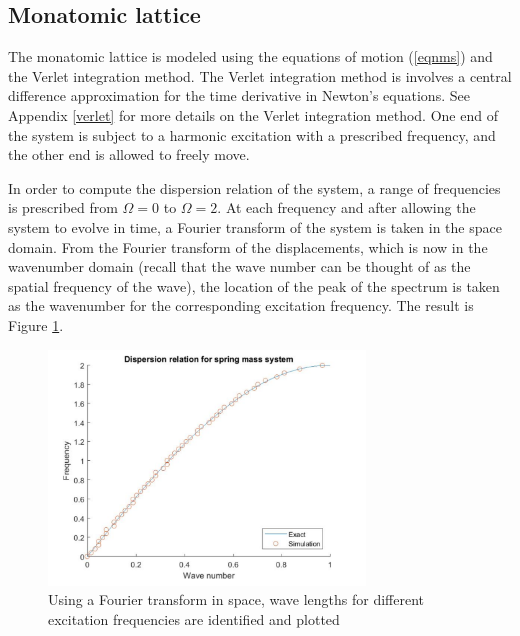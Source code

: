 \documentclass{article}
\begin{document}
\subsection{Monatomic lattice}
The monatomic lattice is modeled using the equations of motion (\ref{eqnms}) 
and the Verlet integration method. The Verlet integration method is involves a 
central difference approximation for the time derivative in Newton's equations. 
See Appendix \ref{verlet} for more details on the Verlet integration method. 
One end of the system is subject to a harmonic excitation with a prescribed 
frequency, and the other end is allowed to freely move.

In order to compute the dispersion relation of the system, a range of 
frequencies is prescribed from $\Omega=0$ to $\Omega=2$. At each frequency and 
after allowing the system to evolve in time, a Fourier transform of the system 
is taken in the space domain. From the Fourier transform of the displacements, 
which is now in the wavenumber domain (recall that the wave number can be 
thought of as the spatial frequency of the wave), the location of the peak of 
the spectrum is taken as the wavenumber for the corresponding excitation 
frequency. The result is Figure \ref{fig:matlab-dr}.
\begin{figure}[!htbp]
	\centering
	\includegraphics[width=0.75\textwidth]{matlab-dr.pdf}
	\caption{Using a Fourier transform in space, wave lengths for different 
	excitation frequencies are identified and plotted}
	\label{fig:matlab-dr}
\end{figure}
\end{document}
